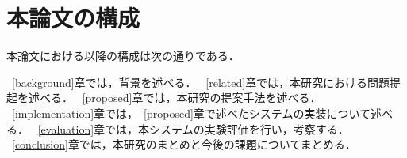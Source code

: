 \section{本論文の構成}

本論文における以降の構成は次の通りである．

~\ref{background}章では，背景を述べる．
~\ref{related}章では，本研究における問題提起を述べる．
~\ref{proposed}章では，本研究の提案手法を述べる．
~\ref{implementation}章では，~\ref{proposed}章で述べたシステムの実装について述べる．
~\ref{evaluation}章では，本システムの実験評価を行い，考察する．
~\ref{conclusion}章では，本研究のまとめと今後の課題についてまとめる．


